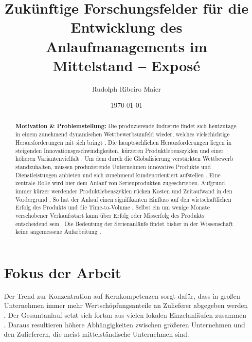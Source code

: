 \documentclass[%
a4paper,
aps,
pra,
 longbibliography,
 lengthcheck,%
]{revtex4-1}
\begin{document}

\title{Zukünftige Forschungsfelder für die Entwicklung des Anlaufmanagements im Mittelstand -- Exposé}

\author{Rudolph Ribeiro Maier}


\date{\today}%

\begin{abstract}
\textbf{Motivation \& Problemstellung:}
Die produzierende Industrie findet sich heutzutage in einem zunehmend dynamischen Wettbewerbsumfeld wieder, welches vielschichtige Herausforderungen mit sich bringt \cite{Renner2012}. Die hauptsächlichen Herausforderungen liegen in steigenden Innovationsgeschwindigkeiten, kürzeren Produktlebenszyklen und einer höheren Variantenvielfalt \cite{Kuhn2002,Stauder2016}. Um dem durch die Globalisierung verstärkten Wettbewerb standzuhalten, müssen produzierende Unternehmen innovative Produkte und Dienstleistungen anbieten und sich zunehmend kundenorientiert aufstellen \cite{Surbier2014}. 
Eine zentrale Rolle wird hier dem Anlauf von Serienprodukten zugeschrieben. Aufgrund immer kürzer werdender Produktlebenszyklen rücken Kosten und Zeitaufwand in den Vordergrund \cite{Winkler2007}. So hat der Anlauf einen signifikanten Einfluss auf den wirtschaftlichen Erfolg des Produkts und die Time-to-Volume \cite{Klocke16}. Selbst ein um wenige Monate verschobener Verkaufsstart kann über Erfolg oder Misserfolg des Produkts entscheidend sein \cite{Schuh2008a}. Die Bedeutung der Serienanläufe findet bisher in der Wissenschaft keine angemessene Aufarbeitung \cite{Dyckhoff2012}. 
\end{abstract}

\maketitle


\section{Fokus der Arbeit}
Der Trend zur Konzentration auf Kernkompetenzen sorgt dafür, dass in großen Unternehmen immer mehr Wertschöpfungsanteile an Zulieferer abgegeben werden  \cite{Hilmola2015, Wildemann2008}. Der Gesamtanlauf setzt sich fortan aus vielen lokalen Einzelanläufen zusammen \cite{Zimolong2006}. Daraus resultieren höhere Abhängigkeiten zwischen größeren Unternehmen und den Zulieferern, die meist mittelständische Unternehmen sind. 
\end{document}
